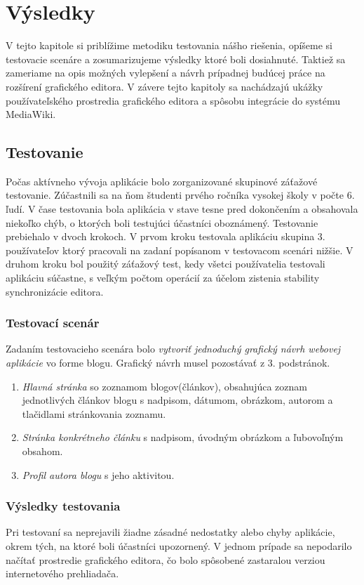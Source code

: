 \chapter{Výsledky}\label{chap:results}
V tejto kapitole si priblížime metodiku testovania nášho riešenia, opíšeme si testovacie scenáre a zosumarizujeme výsledky ktoré boli dosiahnuté. Taktiež sa zameriame na opis možných vylepšení a návrh prípadnej budúcej práce na rozšírení grafického editora. V závere tejto kapitoly sa nachádzajú ukážky používateľského prostredia grafického editora a spôsobu integrácie do systému MediaWiki.

\section{Testovanie}
Počas aktívneho vývoja aplikácie bolo zorganizované skupinové záťažové testovanie. Zúčastnili sa na ňom študenti prvého ročníka vysokej školy v počte 6. ľudí. V čase testovania bola aplikácia v stave tesne pred dokončením a obsahovala niekoľko chýb, o ktorých boli testujúci účastníci oboznámený. Testovanie prebiehalo v dvoch krokoch. V prvom kroku testovala aplikáciu skupina 3. používateľov ktorý pracovali na zadaní popísanom v testovacom scenári nižšie. V druhom kroku bol použitý záťažový test, kedy všetci používatelia testovali aplikáciu súčastne, s veľkým počtom operácií za účelom zistenia stability synchronizácie editora.

\subsection{Testovací scenár}
Zadaním testovacieho scenára bolo \textit{vytvoriť jednoduchý grafický návrh webovej aplikácie} vo forme blogu. Grafický návrh musel pozostávať z 3. podstránok.
\begin{enumerate}
	\item \textit{Hlavná stránka} so zoznamom blogov(článkov), obsahujúca zoznam jednotlivých článkov blogu s nadpisom, dátumom, obrázkom, autorom a tlačidlami stránkovania zoznamu.
	\item \textit{Stránka konkrétneho článku} s nadpisom, úvodným obrázkom a ľubovoľným obsahom.
	\item \textit{Profil autora blogu} s jeho aktivitou.
\end{enumerate}

\subsection{Výsledky testovania}
Pri testovaní sa neprejavili žiadne zásadné nedostatky alebo chyby aplikácie, okrem tých, na ktoré boli účastníci upozornený. V jednom prípade sa nepodarilo načítať prostredie grafického editora, čo bolo spôsobené zastaralou verziou internetového prehliadača. 

